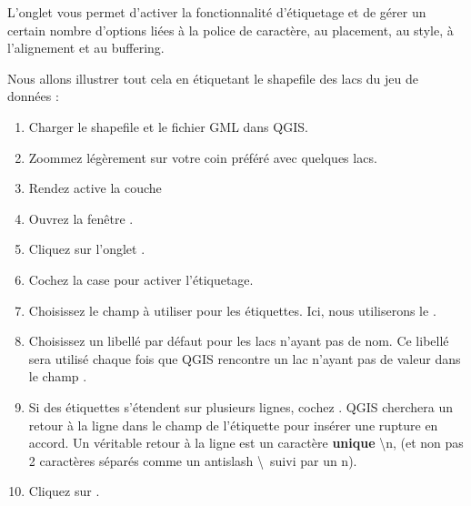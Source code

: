 L'onglet  vous permet d'activer la fonctionnalité d'étiquetage et de gérer un certain nombre d'options liées à la police de caractère, au placement, au style, à l'alignement et au buffering.

Nous allons illustrer tout cela en étiquetant le shapefile des lacs du jeu de données  :

\begin{enumerate}
\item Charger le shapefile  et le fichier GML  dans QGIS.
\item Zoommez légèrement sur votre coin préféré avec quelques lacs.
\item Rendez active la couche 
\item Ouvrez la fenêtre .
\item Cliquez sur l'onglet .
\item Cochez la case  pour activer l'étiquetage.
\item Choisissez le champ à utiliser pour les étiquettes. Ici, nous utiliserons le .
\item Choisissez un libellé par défaut pour les lacs n'ayant pas de nom. Ce libellé sera utilisé chaque fois que QGIS rencontre un lac n'ayant pas de valeur dans le champ .
\item Si des étiquettes s'étendent sur plusieurs lignes, cochez . QGIS cherchera un retour à la ligne dans le champ de l'étiquette pour insérer une rupture en accord. Un véritable retour à la ligne est un caractère \textbf{unique} \textbackslash n, (et non pas 2 caractères séparés comme un antislash \textbackslash ~suivi par un n).
\item Cliquez sur .
\end{enumerate}

